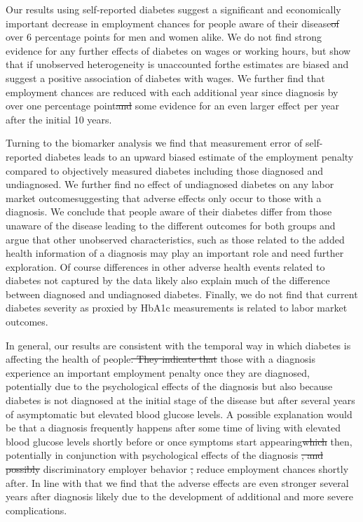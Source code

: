 \documentclass[12pt,english,british]{article}
\providecommand{\DIFaddtex}[1]{{\protect\color{blue}\uwave{#1}}} %
\providecommand{\DIFdeltex}[1]{{\protect\color{red}\sout{#1}}}                      %
\providecommand{\DIFaddbegin}{} %
\providecommand{\DIFaddend}{} %
\providecommand{\DIFdelbegin}{} %
\providecommand{\DIFdelend}{} %
\providecommand{\DIFadd}[1]{\texorpdfstring{\DIFaddtex{#1}}{#1}} %
\providecommand{\DIFdel}[1]{\texorpdfstring{\DIFdeltex{#1}}{}} %
\begin{document}
Our results using self-reported diabetes suggest a significant and economically important decrease in employment chances for people aware of their disease\DIFdelbegin \DIFdel{of }\DIFdelend \DIFaddbegin \DIFadd{, by }\DIFaddend over 6 percentage points for men and women alike. We do not find strong evidence for any further effects of diabetes on wages or working hours, but show that if unobserved heterogeneity is unaccounted for\DIFaddbegin \DIFadd{, then }\DIFaddend the estimates are biased and suggest a \DIFaddbegin \DIFadd{spurious }\DIFaddend positive association of diabetes with wages. We further find that employment chances are reduced with each additional year since diagnosis by over one percentage point\DIFdelbegin \DIFdel{and }\DIFdelend \DIFaddbegin \DIFadd{, with }\DIFaddend some evidence for an even larger effect per year after the initial 10 years. 

Turning to the biomarker analysis we find that measurement error of self-reported diabetes leads to an upward biased estimate of the employment penalty compared to objectively measured diabetes including those diagnosed and undiagnosed. We further find no effect of undiagnosed diabetes on any labor market outcome\DIFaddbegin \DIFadd{, }\DIFaddend suggesting that adverse effects only occur to those with a diagnosis. We conclude that people aware of their diabetes differ from those unaware of the disease leading to the different outcomes for both groups and argue that other unobserved characteristics, such as those related to the added health information of a diagnosis may play an important role and need further exploration. Of course differences in other adverse health events related to diabetes not captured by the data likely also explain much of the difference between diagnosed and undiagnosed diabetes. Finally, we do not find that current diabetes severity as proxied by \ac{HbA1c} measurements is related to labor market outcomes.

In general, our results are consistent with the temporal  way in which diabetes is affecting the health of people\DIFdelbegin \DIFdel{. They indicate that }\DIFdelend \DIFaddbegin \DIFadd{: }\DIFaddend those with a diagnosis experience an important employment penalty once they are diagnosed, potentially due to the psychological effects of the diagnosis but also because diabetes is not diagnosed at the initial stage of the disease but after several years of asymptomatic but elevated blood glucose levels. A possible explanation would be that a diagnosis frequently happens after some time of living with elevated blood glucose levels shortly before or once symptoms start appearing\DIFdelbegin \DIFdel{which }\DIFdelend \DIFaddbegin \DIFadd{. This  }\DIFaddend then, potentially in conjunction with psychological effects of the diagnosis \DIFdelbegin \DIFdel{, and possibly }\DIFdelend \DIFaddbegin \DIFadd{and with possible }\DIFaddend discriminatory employer behavior \DIFdelbegin \DIFdel{, }\DIFdelend \DIFaddbegin \DIFadd{could }\DIFaddend reduce employment chances shortly after. In line with that we find that the adverse effects are even stronger several years after diagnosis likely due to the development of additional and more severe complications.
\end{document}
